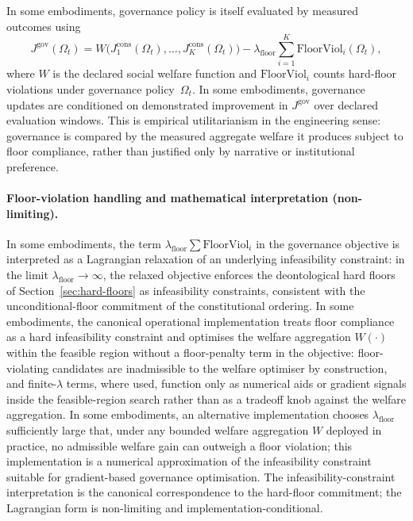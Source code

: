 \documentclass[a4paper,12pt]{article}
\begin{document}
In some embodiments, governance policy is itself evaluated by measured
outcomes using
\[
  J^{\mathrm{gov}}(\Omega_t)
  =
  W\!\bigl(
    J^{\mathrm{cons}}_1(\Omega_t),\ldots,
    J^{\mathrm{cons}}_K(\Omega_t)
  \bigr)
  -
  \lambda_{\mathrm{floor}}
  \sum_{i=1}^{K}\mathrm{FloorViol}_i(\Omega_t),
\]
where $W$ is the declared social welfare function and
$\mathrm{FloorViol}_i$ counts hard-floor violations under governance
policy~$\Omega_t$. In some embodiments, governance updates are
conditioned on demonstrated improvement in
$J^{\mathrm{gov}}$ over declared evaluation windows. This is empirical
utilitarianism in the engineering sense: governance is compared by the
measured aggregate welfare it produces subject to floor compliance,
rather than justified only by narrative or institutional preference.

\paragraph{Floor-violation handling and mathematical interpretation
(non-limiting).}
In some embodiments, the term
$\lambda_{\mathrm{floor}} \sum \mathrm{FloorViol}_i$ in the
governance objective is interpreted as a Lagrangian relaxation of an
underlying infeasibility constraint: in the limit
$\lambda_{\mathrm{floor}} \to \infty$, the relaxed objective enforces
the deontological hard floors of Section~\ref{sec:hard-floors} as
infeasibility constraints, consistent with the unconditional-floor
commitment of the constitutional ordering. In some embodiments, the
canonical operational implementation treats floor compliance as a
hard infeasibility constraint and optimises the welfare aggregation
$W(\cdot)$ within the feasible region without a floor-penalty term
in the objective: floor-violating candidates are inadmissible to the
welfare optimiser by construction, and finite-$\lambda$ terms, where
used, function only as numerical aids or gradient signals inside the
feasible-region search rather than as a tradeoff knob against the
welfare aggregation. In some embodiments, an alternative
implementation chooses $\lambda_{\mathrm{floor}}$ sufficiently large
that, under any bounded welfare aggregation $W$ deployed in
practice, no admissible welfare gain can outweigh a floor violation;
this implementation is a numerical approximation of the
infeasibility constraint suitable for gradient-based governance
optimisation. The infeasibility-constraint interpretation is the
canonical correspondence to the hard-floor commitment; the
Lagrangian form is non-limiting and implementation-conditional.
\end{document}
